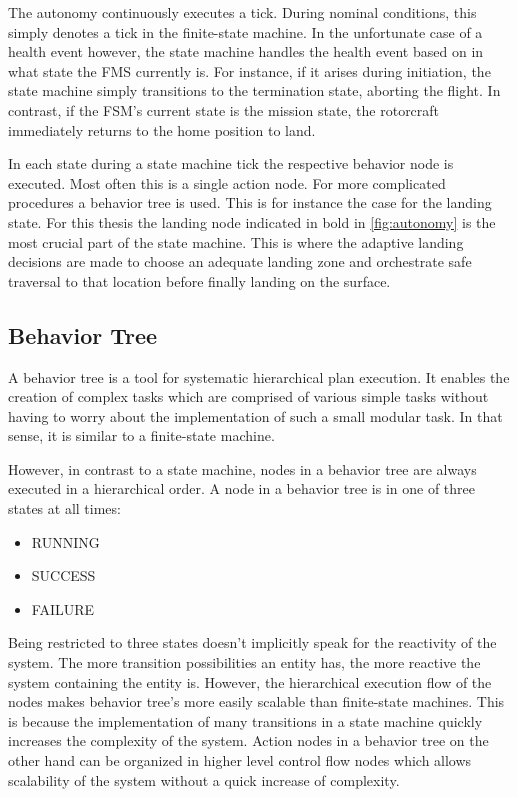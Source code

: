 The autonomy continuously executes a tick. During nominal conditions, this simply denotes a tick in the finite-state machine. In the unfortunate case of a health event however, the state machine handles the health event based on in what state the FMS currently is. For instance, if it arises during initiation, the state machine simply transitions to the termination state, aborting the flight. In contrast, if the FSM's current state is the mission state, the rotorcraft immediately returns to the home position to land.

In each state during a state machine tick the respective behavior node is executed. Most often this is a single action node. For more complicated procedures a behavior tree is used. This is for instance the case for the landing state. For this thesis the landing node indicated in bold in \cref{fig:autonomy} is the most crucial part of the state machine. This is where the adaptive landing decisions are made to choose an adequate landing zone and orchestrate safe traversal to that location before finally landing on the surface.

\subsection{Behavior Tree}\label{subsec:setup:behavior_tree}

A behavior tree is a tool for systematic hierarchical plan execution. It enables the creation of complex tasks which are comprised of various simple tasks without having to worry about the implementation of such a small modular task. In that sense, it is similar to a finite-state machine.

However, in contrast to a state machine, nodes in a behavior tree are always executed in a hierarchical order. A node in a behavior tree is in one of three states at all times: 

\begin{itemize}
    \item RUNNING
    \item SUCCESS
    \item FAILURE
\end{itemize}

Being restricted to three states doesn't implicitly speak for the reactivity of the system. The more transition possibilities an entity has, the more reactive the system containing the entity is. However, the hierarchical execution flow of the nodes makes behavior tree's more easily scalable than finite-state machines. This is because the implementation of many transitions in a state machine quickly increases the complexity of the system. Action nodes in a behavior tree on the other hand can be organized in higher level control flow nodes which allows scalability of the system without a quick increase of complexity.

